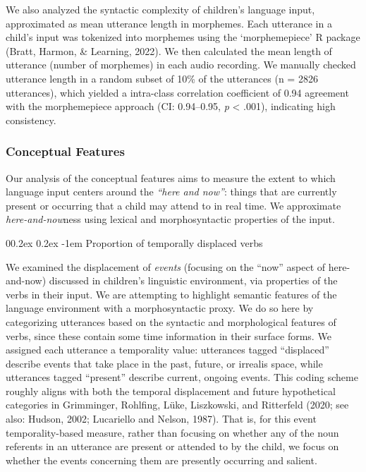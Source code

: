 \documentclass[
  man,floatsintext]{apa6}
\makeatletter
\let\oldparagraph\paragraph
\renewcommand{\paragraph}[1]{\oldparagraph{#1}\mbox{}}
\renewcommand{\paragraph}{\@startsection{paragraph}{4}{\parindent}%
  {0\baselineskip \@plus 0.2ex \@minus 0.2ex}%
  {-1em}%
  {\normalfont\normalsize\bfseries\itshape\typesectitle}}
\makeatother
\begin{document}
We also analyzed the syntactic complexity of children's language input, approximated as mean utterance length in morphemes. Each utterance in a child's input was tokenized into morphemes using the `morphemepiece' R package (Bratt, Harmon, \& Learning, 2022). We then calculated the mean length of utterance (number of morphemes) in each audio recording. We manually checked utterance length in a random subset of 10\% of the utterances (n = 2826 utterances), which yielded a intra-class correlation coefficient of 0.94 agreement with the morphemepiece approach (CI: 0.94--0.95, \emph{p} \textless{} .001), indicating high consistency.

\hypertarget{conceptual-features}{%
\subsubsection{Conceptual Features}\label{conceptual-features}}

Our analysis of the conceptual features aims to measure the extent to which language input centers around the \emph{``here and now''}: things that are currently present or occurring that a child may attend to in real time. We approximate \emph{here-and-now}ness using lexical and morphosyntactic properties of the input.

\hypertarget{proportion-of-temporally-displaced-verbs}{%
\paragraph{Proportion of temporally displaced verbs}\label{proportion-of-temporally-displaced-verbs}}

We examined the displacement of \emph{events} (focusing on the ``now'' aspect of here-and-now) discussed in children's linguistic environment, via properties of the verbs in their input. We are attempting to highlight semantic features of the language environment with a morphosyntactic proxy. We do so here by categorizing utterances based on the syntactic and morphological features of verbs, since these contain some time information in their surface forms. We assigned each utterance a temporality value: utterances tagged ``displaced'' describe events that take place in the past, future, or irrealis space, while utterances tagged ``present'' describe current, ongoing events. This coding scheme roughly aligns with both the temporal displacement and future hypothetical categories in Grimminger, Rohlfing, Lüke, Liszkowski, and Ritterfeld (2020; see also: Hudson, 2002; Lucariello and Nelson, 1987). That is, for this event temporality-based measure, rather than focusing on whether any of the noun referents in an utterance are present or attended to by the child, we focus on whether the events concerning them are presently occurring and salient.
\end{document}

